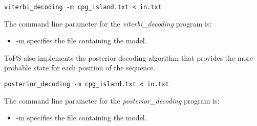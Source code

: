 \begin{Verbatim}[frame=single, label={Command line}]
viterbi_decoding -m cpg_island.txt < in.txt
\end{Verbatim}


The command line parameter for the \textit{viterbi\_decoding} program is:
\begin{itemize}
\item -m specifies the file containing the  model.
\end{itemize}


ToPS also implements the posterior decoding algorithm that provides the more probable state for each position of the sequence.


\begin{Verbatim}[frame=single, label={Command line}]
posterior_decoding -m cpg_island.txt < in.txt
\end{Verbatim}

The command line parameter for the \textit{posterior\_decoding} program is:
\begin{itemize}
\item -m specifies the file containing the  model.
\end{itemize}







